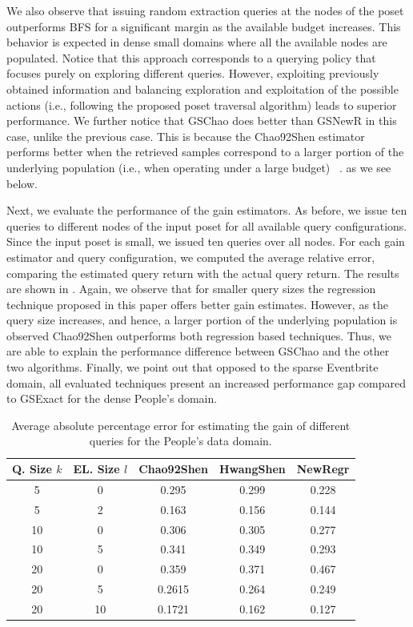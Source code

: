 We also observe that issuing random extraction queries at the nodes of the poset outperforms BFS for a significant margin as the available budget increases. This behavior is expected in dense small domains where all the available nodes are populated. Notice that this approach corresponds to a querying policy that focuses purely on exploring different queries. However, exploiting previously obtained information and balancing exploration and exploitation of the possible actions (i.e., following the proposed poset traversal algorithm) leads to superior performance. We further notice that GSChao does better than GSNewR in this case, unlike the previous case. This is because the Chao92Shen estimator performs better when the retrieved samples correspond to a larger portion of the underlying population (i.e., when operating under a large budget) \ifpaper~\cite{crowdgatherfull}. \fi \iftr as we see below. \fi

\iftr
Next, we evaluate the performance of the gain estimators. As before, we issue ten queries to different nodes of the input poset for all available query configurations. Since the input poset is small, we issued ten queries over all nodes. For each gain estimator and query configuration, we computed the average relative error, comparing the estimated query return with the actual query return. The results are shown in . Again, we observe that for smaller query sizes the regression technique proposed in this paper offers better gain estimates. However, as the query size increases, and hence, a larger portion of the underlying population is observed Chao92Shen outperforms both regression based techniques. Thus, we are able to explain the performance difference between GSChao and the other two algorithms. Finally, we point out that opposed to the sparse Eventbrite domain, all evaluated techniques present an increased performance gap compared to GSExact for the dense People's domain.

\begin{table}[h]
\vspace{-5pt}
\scriptsize \center
\caption{Average absolute percentage error for estimating the gain of different queries for the People's data domain.}
\label{tab:peopleesterror}
\begin{tabular}{|c|c|c|c|c|}
\hline
\textbf{Q. Size $k$} & \textbf{EL. Size $l$} & \textbf{Chao92Shen} & \textbf{HwangShen} & \textbf{NewRegr} \\ \hline
5 & 0 & 0.295 & 0.299 & 0.228\\
5 & 2 & 0.163 &  0.156 & 0.144\\
10 & 0 &  0.306 & 0.305 & 0.277\\
10 & 5 &  0.341 & 0.349 & 0.293\\
20 & 0 &  0.359& 0.371 & 0.467 \\
20 & 5 &  0.2615 & 0.264 & 0.249\\
20 & 10 & 0.1721 & 0.162 & 0.127\\
\hline
\end{tabular}
\vspace{-5pt}
\end{table}
\fi

